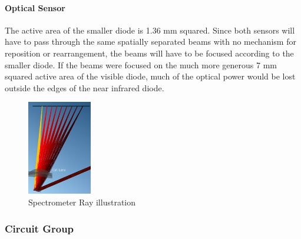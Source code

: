 \paragraph{Optical Sensor} The active area of the smaller diode is 1.36 mm squared. Since both sensors will have to pass through the same spatially separated beams with no mechanism for reposition or rearrangement, the beams will have to be focused according to the smaller diode. If the beams were focused on the much more generous 7 mm squared active area of the visible diode, much of the optical power would be lost outside the edges of the near infrared diode.

\begin{figure}[H]
    \caption{Spectrometer Ray illustration}
    \centering
    \includegraphics[width=0.25\textwidth]{images/YuanCaoSpectrometer.png}
\end{figure}

\subsubsection{Circuit Group}

